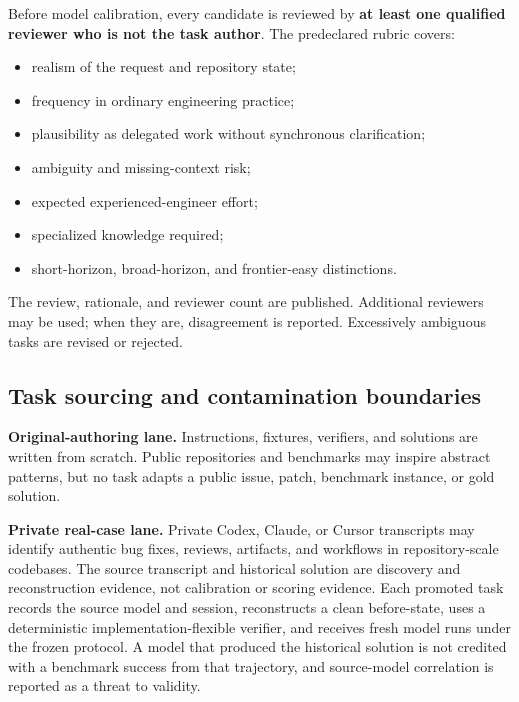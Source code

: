 \documentclass[11pt]{article}
\begin{document}
Before model calibration, every candidate is reviewed by \textbf{at least one qualified reviewer who is not the task author}. The predeclared rubric covers:

\begin{itemize}
\item{} realism of the request and repository state;
\item{} frequency in ordinary engineering practice;
\item{} plausibility as delegated work without synchronous clarification;
\item{} ambiguity and missing-context risk;
\item{} expected experienced-engineer effort;
\item{} specialized knowledge required;
\item{} short-horizon, broad-horizon, and frontier-easy distinctions.
\end{itemize}

The review, rationale, and reviewer count are published. Additional reviewers may be used; when they are, disagreement is reported. Excessively ambiguous tasks are revised or rejected.

\subsection{Task sourcing and contamination boundaries}\hypertarget{53-task-sourcing-and-contamination-boundaries}{}\label{53-task-sourcing-and-contamination-boundaries}

\textbf{Original-authoring lane.} Instructions, fixtures, verifiers, and solutions are written from scratch. Public repositories and benchmarks may inspire abstract patterns, but no task adapts a public issue, patch, benchmark instance, or gold solution.

\textbf{Private real-case lane.} Private Codex, Claude, or Cursor transcripts may identify authentic bug fixes, reviews, artifacts, and workflows in repository-scale codebases. The source transcript and historical solution are discovery and reconstruction evidence, not calibration or scoring evidence. Each promoted task records the source model and session, reconstructs a clean before-state, uses a deterministic implementation-flexible verifier, and receives fresh model runs under the frozen protocol. A model that produced the historical solution is not credited with a benchmark success from that trajectory, and source-model correlation is reported as a threat to validity.
\end{document}
